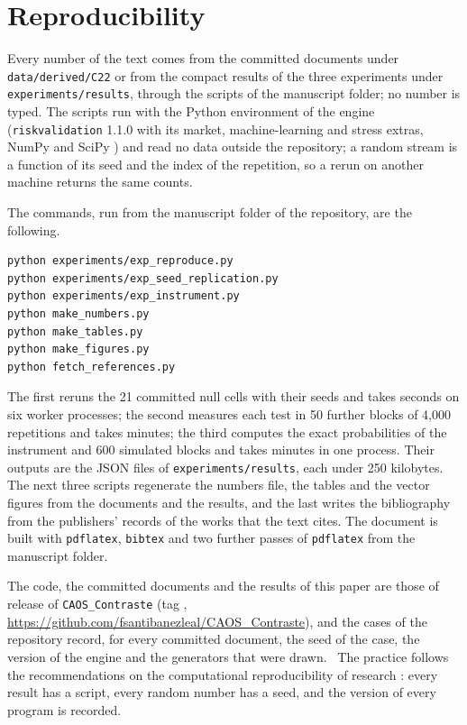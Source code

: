 \section{Reproducibility}
\label{sec:reproducibility}

Every number of the text comes from the committed documents under \texttt{data/derived/C22} or from the compact results of the three experiments under \texttt{experiments/results}, through the scripts of the manuscript folder; no number is typed.
The scripts run with the Python environment of the engine (\texttt{riskvalidation} 1.1.0 with its market, machine-learning and stress extras, NumPy \citep{harris2020} and SciPy \citep{virtanen2020}) and read no data outside the repository; a random stream is a function of its seed and the index of the repetition, so a rerun on another machine returns the same counts.

The commands, run from the manuscript folder of the repository, are the following.
\begin{verbatim}
python experiments/exp_reproduce.py
python experiments/exp_seed_replication.py
python experiments/exp_instrument.py
python make_numbers.py
python make_tables.py
python make_figures.py
python fetch_references.py
\end{verbatim}
The first reruns the 21 committed null cells with their seeds and takes \reproSeconds{} seconds on six worker processes; the second measures each test in 50 further blocks of 4,000 repetitions and takes \seedMinutes{} minutes; the third computes the exact probabilities of the instrument and 600 simulated blocks and takes \instrMinutes{} minutes in one process.
Their outputs are the JSON files of \texttt{experiments/results}, each under 250 kilobytes.
The next three scripts regenerate the numbers file, the tables and the vector figures from the documents and the results, and the last writes the bibliography from the publishers' records of the works that the text cites.
The document is built with \texttt{pdflatex}, \texttt{bibtex} and two further passes of \texttt{pdflatex} from the manuscript folder.

The code, the committed documents and the results of this paper are those of release \docversion{} of \texttt{CAOS\_Contraste} (tag \texttt{\docversion{}}, \url{https://github.com/fsantibanezleal/CAOS_Contraste}), and the cases of the repository record, for every committed document, the seed of the case, the version of the engine and the generators that were drawn.\ %
The practice follows the recommendations on the computational reproducibility of research \citep{sandve2013}: every result has a script, every random number has a seed, and the version of every program is recorded.
